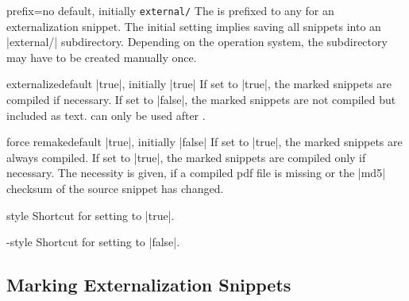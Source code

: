\begin{extTcbKey}[][doc new=2015-03-11]{prefix}{=}{no default,
  initially \texttt{external/}}
The  is prefixed to any  for an
externalization snippet. The initial setting implies saving all snippets
into an |external/| subdirectory. Depending on the operation system,
the subdirectory may have to be created manually once.
\begin{dispListing}
\end{dispListing}
\end{extTcbKey}


\begin{extTcbKey}[][doc new=2015-03-11]{externalize}{}{default |true|,
  initially |true|}
If set to |true|, the marked snippets are compiled if necessary.
If set to |false|, the marked snippets are not compiled but included as text.
 can only be used after .
\end{extTcbKey}

\begin{extTcbKey}[][doc new=2015-03-11]{force remake}{}{default |true|,
  initially |false|}
If set to |true|, the marked snippets are always compiled.
If set to |true|, the marked snippets are compiled only if necessary.
The necessity is given, if a compiled pdf file is missing or the
|md5| checksum of the source snippet has changed.
\end{extTcbKey}

\enlargethispage*{1cm}
\begin{extTcbKey}[][doc new and updated={2015-03-11}{2017-02-24}]{\tcbexclamation}{}{style}
  Shortcut for setting  to |true|.
\end{extTcbKey}

\begin{extTcbKey}[][doc new and updated={2015-06-12}{2017-02-24}]{-}{}{style}
  Shortcut for setting  to |false|.
\end{extTcbKey}


\subsection{Marking Externalization Snippets}\label{subsec:external_marking}

